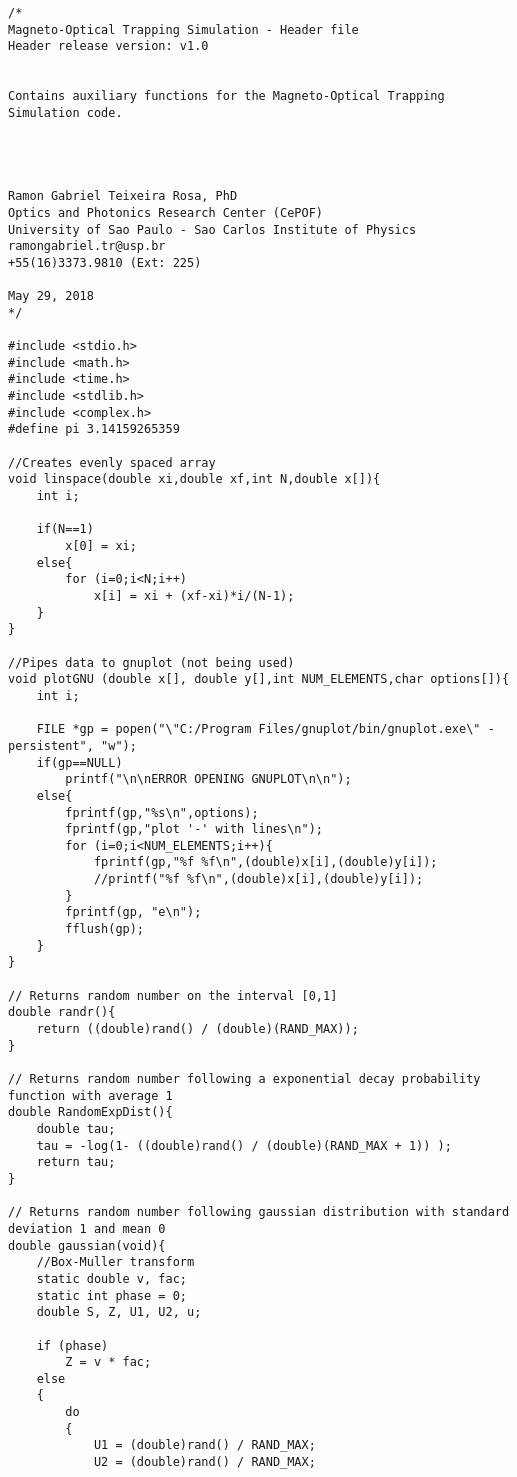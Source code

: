 \begin{lstlisting}[style=CStyle]
/*
Magneto-Optical Trapping Simulation - Header file
Header release version: v1.0


Contains auxiliary functions for the Magneto-Optical Trapping Simulation code.




Ramon Gabriel Teixeira Rosa, PhD
Optics and Photonics Research Center (CePOF)
University of Sao Paulo - Sao Carlos Institute of Physics
ramongabriel.tr@usp.br
+55(16)3373.9810 (Ext: 225)

May 29, 2018
*/

#include <stdio.h>
#include <math.h>
#include <time.h>
#include <stdlib.h>
#include <complex.h>
#define pi 3.14159265359

//Creates evenly spaced array
void linspace(double xi,double xf,int N,double x[]){
    int i;

    if(N==1)
        x[0] = xi;
    else{
        for (i=0;i<N;i++)
            x[i] = xi + (xf-xi)*i/(N-1);
    }
}

//Pipes data to gnuplot (not being used)
void plotGNU (double x[], double y[],int NUM_ELEMENTS,char options[]){
    int i;

    FILE *gp = popen("\"C:/Program Files/gnuplot/bin/gnuplot.exe\" -persistent", "w");
    if(gp==NULL)
        printf("\n\nERROR OPENING GNUPLOT\n\n");
    else{
        fprintf(gp,"%s\n",options);
        fprintf(gp,"plot '-' with lines\n");
        for (i=0;i<NUM_ELEMENTS;i++){
            fprintf(gp,"%f %f\n",(double)x[i],(double)y[i]);
            //printf("%f %f\n",(double)x[i],(double)y[i]);
        }
        fprintf(gp, "e\n");
        fflush(gp);
    }
}

// Returns random number on the interval [0,1]
double randr(){
    return ((double)rand() / (double)(RAND_MAX));
}

// Returns random number following a exponential decay probability function with average 1
double RandomExpDist(){
    double tau;
    tau = -log(1- ((double)rand() / (double)(RAND_MAX + 1)) );
    return tau;
}

// Returns random number following gaussian distribution with standard deviation 1 and mean 0
double gaussian(void){
    //Box-Muller transform
    static double v, fac;
    static int phase = 0;
    double S, Z, U1, U2, u;

    if (phase)
        Z = v * fac;
    else
    {
        do
        {
            U1 = (double)rand() / RAND_MAX;
            U2 = (double)rand() / RAND_MAX;


\end{lstlisting}
